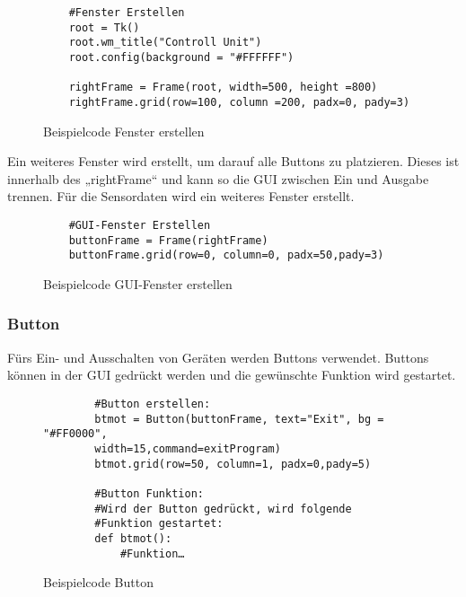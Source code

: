 \vspace{3mm}
\begin{figure}[H]
    \centering
    \begin{verbatim}
    #Fenster Erstellen
    root = Tk()
    root.wm_title("Controll Unit")
    root.config(background = "#FFFFFF")
 
    rightFrame = Frame(root, width=500, height =800)
    rightFrame.grid(row=100, column =200, padx=0, pady=3)
    \end{verbatim}
    \caption{Beispielcode Fenster erstellen}
\end{figure}
Ein weiteres Fenster wird erstellt, um darauf alle Buttons zu platzieren. Dieses ist innerhalb des „rightFrame“ und kann so die GUI zwischen Ein und Ausgabe trennen. Für die Sensordaten wird ein weiteres Fenster erstellt.\\
\vspace{3mm}
\begin{figure}[H]
    \centering
    \begin{verbatim}
    #GUI-Fenster Erstellen
    buttonFrame = Frame(rightFrame)
    buttonFrame.grid(row=0, column=0, padx=50,pady=3) 
    \end{verbatim}
    \caption{Beispielcode GUI-Fenster erstellen}
\end{figure}

\newpage
\subsubsection{Button}\label{sec:Button}
Fürs Ein- und Ausschalten von Geräten werden Buttons verwendet. Buttons können in der GUI gedrückt werden und die gewünschte Funktion wird gestartet.\\
\vspace{3mm}
\begin{figure}[H]
	\centering
	\begin{verbatim}
		#Button erstellen:
		btmot = Button(buttonFrame, text="Exit", bg = "#FF0000",
		width=15,command=exitProgram)
		btmot.grid(row=50, column=1, padx=0,pady=5)
		
		#Button Funktion:
		#Wird der Button gedrückt, wird folgende 
		#Funktion gestartet:
		def btmot():
			#Funktion… 
	\end{verbatim}
	\caption{Beispielcode Button}
\end{figure}


